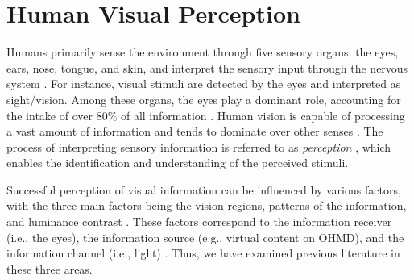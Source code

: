 \section{Human Visual Perception}
\label{sec:Relatedwork:human_visual_perception}

Humans primarily sense the environment through five sensory organs: the eyes, ears, nose, tongue, and skin, and interpret the sensory input through the nervous system \cite{kalat_biological_2012}. For instance, visual stimuli are detected by the eyes and interpreted as sight/vision. Among these organs, the eyes play a dominant role, accounting for the intake of over 80\% of all information \cite{rosenblum2011see}. Human vision is capable of processing a vast amount of information and tends to dominate over other senses \cite{stokes_dominance_2015}.  The process of interpreting sensory information is referred to as \textit{perception} \cite[Ch~1]{goldstein_sensation_2016}, which enables the identification and understanding of the perceived stimuli.


Successful perception of visual information can be influenced by various factors, with the three main factors being the vision regions, patterns of the information, and luminance contrast \cite[Ch~6]{ware_information_2013}. These factors correspond to the information receiver (i.e., the eyes), the information source (e.g., virtual content on OHMD), and the information channel (i.e., light) \cite{kalat_biological_2012, ware_information_2013}. Thus, we have examined previous literature in these three areas.


